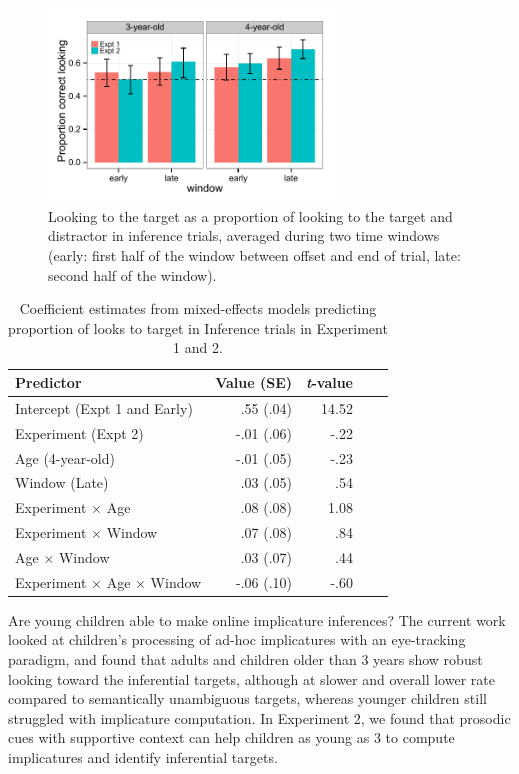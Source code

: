 \documentclass[10pt,letterpaper]{article}
\begin{document}
\begin{figure}[t]
\begin{center} 
\includegraphics[width=3in]{figures/expt12-accuracy_inf.pdf}
\caption{\label{fig:0prosbar} Looking to the target as a proportion of looking to the target and distractor in inference trials, averaged during two time windows (early: first half of the window between offset and end of trial, late: second half of the window).}
\end{center} 
\end{figure}

\begin{table}[b!]
\caption{\label{tab:lmer4}  Coefficient estimates from mixed-effects models predicting proportion of looks to target in Inference trials in Experiment 1 and 2.} 
\begin{center} 
\begin{tabular}{l r r r l} 
\hline
Predictor  &  Value (SE) & \emph{t}-value\\
\hline
Intercept (Expt 1 and Early)  & .55 (.04) & 14.52 \\
Experiment (Expt 2)  & -.01 (.06) &  -.22 \\
Age (4-year-old) & -.01 (.05) &  -.23 \\
Window (Late) & .03 (.05) & .54 \\
Experiment $\times$  Age & .08 (.08) & 1.08 \\
Experiment $\times$  Window & .07 (.08) & .84 \\
Age $\times$  Window & .03 (.07) & .44 \\
Experiment $\times$ Age $\times$ Window & -.06 (.10) & -.60 \\
\hline
\end{tabular} 
\end{center} 
\end{table}

Are young children able to make online implicature inferences? The current work looked at children's processing of ad-hoc implicatures with an eye-tracking paradigm, and found that adults and children older than 3 years show robust looking toward the inferential targets, although at slower and overall lower rate compared to semantically unambiguous targets, whereas younger children still struggled with implicature computation. In Experiment 2, we found that prosodic cues with supportive context can help children as young as 3 to compute implicatures and identify inferential targets.
\end{document}
